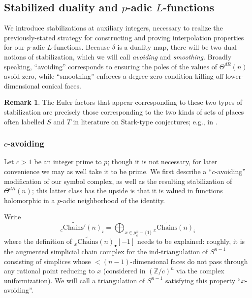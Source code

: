 \documentclass[10pt]{amsart}
\theoremstyle{definition}
\newtheorem{rem}[thm]{Remark}
\newcommand{\Z}{\mathbb{Z}}
\newcommand{\Chains}{\mathrm{Chains}}
\numberwithin{equation}{section}
\begin{document}
    \subsection{Stabilized duality and $p$-adic $L$-functions} \label{section:smooth}

    We introduce stabilizations at auxiliary integers, necessary to realize the previously-stated strategy for constructing and proving interpolation properties for our $p$-adic $L$-functions. Because $\delta$ is a duality map, there will be two dual notions of stabilization, which we will call \emph{avoiding} and \emph{smoothing}. Broadly speaking, ``avoiding'' corresponds to ensuring the poles of the values of $\Theta^{dR}(n)$ avoid zero, while ``smoothing'' enforces a degree-zero condition killing off lower-dimensional conical faces.

    \begin{rem}
        The Euler factors that appear corresponding to these two types of stabilization are precisely those corresponding to the two kinds of sets of places often labelled $S$ and $T$ in literature on Stark-type conjectures; e.g., in \cite{DK}.
    \end{rem}

    \subsubsection{$c$-avoiding}
    Let $c>1$ be an integer prime to $p$; though it is not necessary, for later convenience we may as well take it to be prime. We first describe a ``$c$-avoiding'' modification of our symbol complex, as well as the resulting stabilization of $\Theta^{dR}(n)$; this latter class has the upside is that it is valued in functions holomorphic in a $p$-adic neighborhood of the identity.
    
    Write
    \[
    {}_c\widetilde{\Chains'}(n)_i=\bigoplus_{x\in \mu_{c}^n-\{1\}} {}_x\widetilde{\Chains}(n)_i
    \]
    where the definition of ${}_x\widetilde{\Chains}(n)_\bullet [-1]$ needs to be explained: roughly, it is the augmented simplicial chain complex for the ind-triangulation of $S^{n-1}$ consisting of simplices whose $< (n-1)$-dimensional faces do not pass through any rational point reducing to $x$ (considered in $(\Z/c)^n$ via the complex uniformization). We will call a triangulation of $S^{n-1}$ satisfying this property ``$x$-avoiding''.
\end{document}
